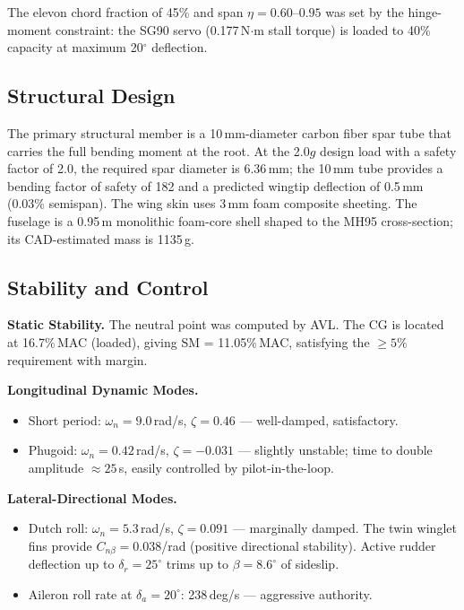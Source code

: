 \documentclass[10pt]{article}
\begin{document}
The elevon chord fraction of 45\% and span $\eta = 0.60$--$0.95$ was set by the
hinge-moment constraint: the SG90 servo (0.177\,N$\cdot$m stall torque) is loaded
to 40\% capacity at maximum 20$^\circ$ deflection.

\subsection{Structural Design}

The primary structural member is a 10\,mm-diameter carbon fiber spar tube
that carries the full bending moment at the root. At the 2.0$g$ design load
with a safety factor of 2.0, the required spar diameter is 6.36\,mm;
the 10\,mm tube provides a bending factor of safety of 182 and a predicted
wingtip deflection of 0.5\,mm (0.03\% semispan). The wing skin uses 3\,mm
foam composite sheeting. The fuselage is a 0.95\,m monolithic foam-core
shell shaped to the MH95 cross-section; its CAD-estimated mass is 1135\,g.

\subsection{Stability and Control}

\textbf{Static Stability.}
The neutral point was computed by AVL. The CG is located at 16.7\%\,MAC (loaded),
giving SM = 11.05\%\,MAC, satisfying the $\geq 5\%$ requirement with margin.

\textbf{Longitudinal Dynamic Modes.}
\begin{itemize}\itemsep0pt
  \item Short period: $\omega_n = 9.0$\,rad/s, $\zeta = 0.46$ — well-damped, satisfactory.
  \item Phugoid: $\omega_n = 0.42$\,rad/s, $\zeta = -0.031$ — slightly unstable;
    time to double amplitude $\approx 25$\,s, easily controlled by pilot-in-the-loop.
\end{itemize}

\textbf{Lateral-Directional Modes.}
\begin{itemize}\itemsep0pt
  \item Dutch roll: $\omega_n = 5.3$\,rad/s, $\zeta = 0.091$ — marginally damped.
    The twin winglet fins provide $C_{n\beta} = 0.038$/rad (positive directional stability).
    Active rudder deflection up to $\delta_r = 25^\circ$ trims up to $\beta = 8.6^\circ$
    of sideslip.
  \item Aileron roll rate at $\delta_a = 20^\circ$: 238\,deg/s — aggressive authority.
\end{itemize}
\end{document}
